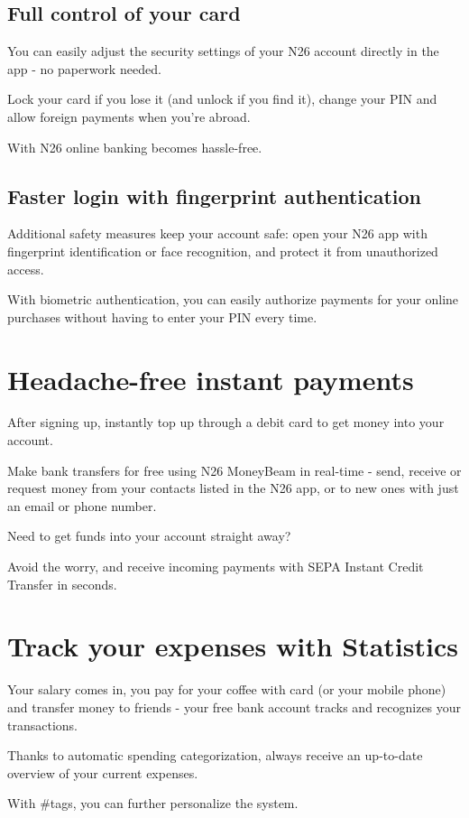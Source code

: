 \documentclass[onsided]{book}
\numberwithin{equation}{section}
\begin{document}
\subsection{Full control of your card}
You can easily adjust the security settings of your N26 account directly in the app - no paperwork needed.

Lock your card if you lose it (and unlock if you find it), change your PIN and allow foreign payments when you're abroad.

With N26 online banking becomes hassle-free.

\subsection{Faster login with fingerprint authentication}
Additional safety measures keep your account safe: open your N26 app with fingerprint identification or face recognition, and protect it from unauthorized access.

With biometric authentication, you can easily authorize payments for your online purchases without having to enter your PIN every time.

\section{Headache-free instant payments}
After signing up, instantly top up through a debit card to get money into your account.

Make bank transfers for free using N26 MoneyBeam in real-time - send, receive or request money from your contacts listed in the N26 app, or to new ones with just an email or phone number.

%
Need to get funds into your account straight away?

Avoid the worry, and receive incoming payments with SEPA Instant Credit Transfer in seconds.

\section{Track your expenses with Statistics}
Your salary comes in, you pay for your coffee with card (or your mobile phone) and transfer money to friends - your free bank account tracks and recognizes your transactions.

Thanks to automatic spending categorization, always receive an up-to-date overview of your current expenses.

%
With \#tags, you can further personalize the system.
\end{document}
